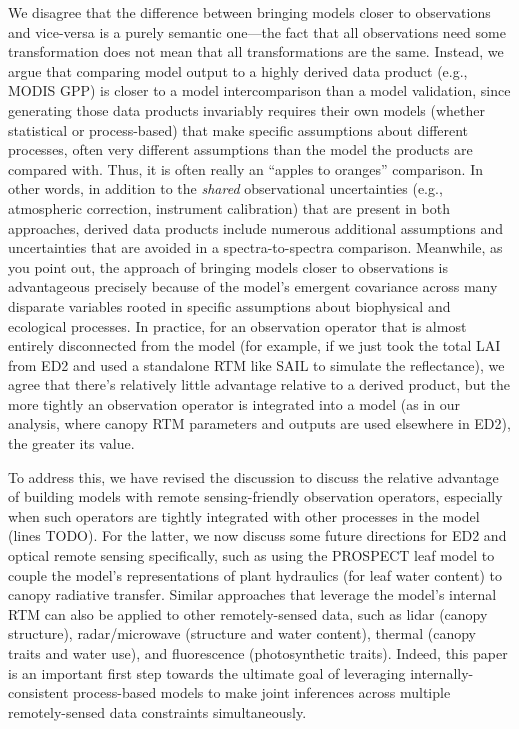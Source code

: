 We disagree that the difference between bringing models closer to observations and vice-versa is a purely semantic one---the fact that all observations need some transformation does not mean that all transformations are the same.
Instead, we argue that comparing model output to a highly derived data product (e.g., MODIS GPP) is closer to a model intercomparison than a model validation, since generating those data products invariably requires their own models (whether statistical or process-based) that make specific assumptions about different processes, often very different assumptions than the model the products are compared with.
Thus, it is often really an ``apples to oranges'' comparison.
In other words, in addition to the \emph{shared} observational uncertainties (e.g., atmospheric correction, instrument calibration) that are present in both approaches, derived data products include numerous additional assumptions and uncertainties that are avoided in a spectra-to-spectra comparison.
Meanwhile, as you point out, the approach of bringing models closer to observations is advantageous precisely because of the model’s emergent covariance across many disparate variables rooted in specific assumptions about biophysical and ecological processes.
In practice, for an observation operator that is almost entirely disconnected from the model (for example, if we just took the total LAI from ED2 and used a standalone RTM like SAIL to simulate the reflectance), we agree that there’s relatively little advantage relative to a derived product,
but the more tightly an observation operator is integrated into a model (as in our analysis, where canopy RTM parameters and outputs are used elsewhere in ED2), the greater its value.

To address this, we have revised the discussion to discuss the relative advantage of building models with remote sensing-friendly observation operators, especially when such operators are tightly integrated with other processes in the model (lines TODO).
For the latter, we now discuss some future directions for ED2 and optical remote sensing specifically, such as using the PROSPECT leaf model to couple the model’s representations of plant hydraulics (for leaf water content) to canopy radiative transfer.
Similar approaches that leverage the model’s internal RTM can also be applied to other remotely-sensed data, such as lidar (canopy structure), radar/microwave (structure and water content), thermal (canopy traits and water use), and fluorescence (photosynthetic traits).
Indeed, this paper is an important first step towards the ultimate goal of leveraging internally-consistent process-based models to make joint inferences across multiple remotely-sensed data constraints simultaneously.

